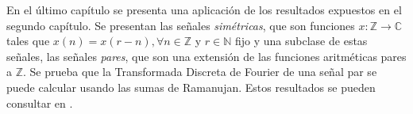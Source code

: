 En el último capítulo se presenta una aplicación de los resultados expuestos en el segundo capítulo. Se presentan las señales \textit{simétricas}, que son funciones $x : \mathbb{Z} \longrightarrow \mathbb{C}$ tales que $x(n) = x(r-n), \forall n \in \mathbb{Z}$ y $r \in \mathbb{N}$ fijo y una subclase de estas señales, las señales \textit{pares}, que son una extensión de las funciones aritméticas pares a $\mathbb{Z}$. Se prueba que la Transformada Discreta de Fourier de una señal par se puede calcular usando las sumas de Ramanujan. Estos resultados se pueden consultar en \cite{Prand1, Sam1}.
